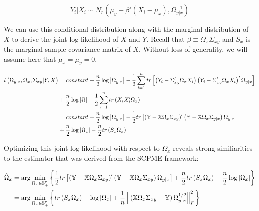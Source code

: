\documentclass[11pt,]{report}
\theoremstyle{definition}
\theoremstyle{definition}
\theoremstyle{definition}
\theoremstyle{remark}
\begin{document}
\begin{equation}
Y_{i} | X_{i} \sim N_{r}\left( \mu_{y} + \beta'\left(X_{i} - \mu_{x}\right), \Omega_{y | x}^{-1} \right)
\end{equation}

We can use this conditional distribution along with the marginal distribution of \(X\) to derive the joint log-likelihood of \(X\) and \(Y\). Recall that \(\beta \equiv \Omega_{x}\Sigma_{xy}\) and \(S_{x}\) is the marginal sample covariance matrix of \(X\). Without loss of generality, we will assume here that \(\mu_{x} = \mu_{y} = 0\).

\begin{equation}
\begin{split}
  l\left( \Omega_{y | x}, \Omega_{x}, \Sigma_{xy} | Y, X \right) &= constant + \frac{n}{2}\log\left| \Omega_{y | x} \right| - \frac{1}{2}\sum_{i = 1}^{n} tr\left[ \left( Y_{i} - \Sigma_{xy}'\Omega_{x} X_{i} \right)\left( Y_{i} - \Sigma_{xy}'\Omega_{x} X_{i} \right)'\Omega_{y | x} \right] \\
  &+\frac{n}{2}\log\left| \Omega \right| - \frac{1}{2}\sum_{i = 1}^{n}tr\left( X_{i}X_{i}'\Omega_{x} \right) \\
  &= constant + \frac{n}{2}\log\left| \Omega_{y | x} \right| - \frac{1}{2}tr\left[ \left( \mathbb{Y} - \mathbb{X}\Omega_{x}\Sigma_{xy} \right)'\left( \mathbb{Y} - \mathbb{X}\Omega_{x}\Sigma_{y | x} \right)\Omega_{y | x} \right] \\
  &+ \frac{n}{2}\log\left| \Omega_{x} \right| - \frac{n}{2}tr\left( S_{x}\Omega_{x} \right)
\label{eq:partialjointloglik}\notag
\end{split}
\end{equation}

Optimizing this joint log-likelihood with respect to \(\Omega_{x}\) reveals strong similiarities to the estimator that was derived from the SCPME framework:

\begin{equation}
\begin{split}
  \hat{\Omega}_{x} &= \arg\min_{\Omega_{x} \in \mathbb{S}_{+}^{p}}\left\{ \frac{1}{2}tr\left[ \left( \mathbb{Y} - \mathbb{X}\Omega_{x}\Sigma_{xy} \right)'\left( \mathbb{Y} - \mathbb{X}\Omega_{x}\Sigma_{xy} \right)\Omega_{y | x} \right] + \frac{n}{2}tr\left( S_{x}\Omega_{x} \right) - \frac{n}{2}\log\left| \Omega_{x} \right| \right\} \\
  &= \arg\min_{\Omega_{x} \in \mathbb{S}_{+}^{p}}\left\{ tr\left( S_{x}\Omega_{x} \right) - \log\left| \Omega_{x} \right| + \frac{1}{n}\left\| \left( \mathbb{X}\Omega_{x}\Sigma_{xy} - \mathbb{Y} \right)\Omega_{y | x}^{1/2} \right\|_{F}^{2} \right\}
\label{eq:omegajointloglik}\notag
\end{split}
\end{equation}
\end{document}
